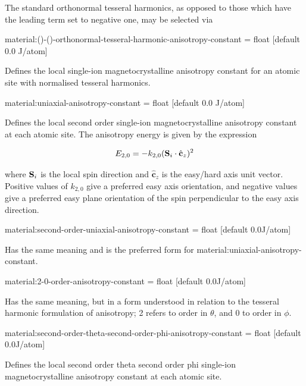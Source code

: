 \noindent The standard orthonormal tesseral harmonics, as opposed to those which have the leading term set to negative one, may be selected via

{\zicf material:()-()-orthonormal-tesseral-harmonic-anisotropy-constant = float [default 0.0 J/atom]} Defines the local single-ion magnetocrystalline anisotropy constant for an atomic site with normalised tesseral harmonics.

{\zicf material:uniaxial-anisotropy-constant = float [default 0.0 J/atom]} Defines the local second order single-ion magnetocrystalline anisotropy constant at each atomic site. The anisotropy energy is given by the expression

\begin{equation*}
E_{2,0} = -k_{2,0} (\mathbf{S}_i \cdot \hat{\mathbf{c}}_z )^2
\end{equation*}

\noindent where $\mathbf{S}_i$ is the local spin direction and $\hat{\mathbf{c}}_z$ is the easy/hard axis unit vector. Positive values of $k_{2,0}$ give a preferred easy axis orientation, and negative values give a preferred easy plane orientation of the spin perpendicular to the easy axis direction.

{\zicf material:second-order-uniaxial-anisotropy-constant = float [default 0.0\newline J/atom]} Has the same meaning and is the preferred form for material:uniaxial-anisotropy-constant.

{\zicf material:2-0-order-anisotropy-constant = float [default 0.0\newline J/atom]} Has the same meaning, but in a form understood in relation to the tesseral harmonic formulation of anisotropy; 2 refers to order in $\theta$, and 0 to order in $\phi$.

{\zicf material:second-order-theta-second-order-phi-anisotropy-constant = float [default 0.0\newline J/atom]} Defines the local second order theta second order phi single-ion magnetocrystalline anisotropy constant at each atomic site.

